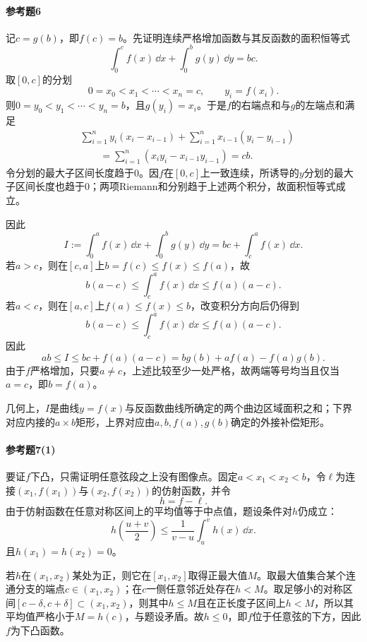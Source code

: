\paragraph{参考题6}
\begin{xsolution}
记$c=g(b)$，即$f(c)=b$。先证明连续严格增加函数与其反函数的面积恒等式
\[
 \int_0^cf(x)\,\dd x+\int_0^bg(y)\,\dd y=bc.
\]
取$[0,c]$的分划
\[
 0=x_0<x_1<\cdots<x_n=c,
 \qquad y_i=f(x_i).
\]
则$0=y_0<y_1<\cdots<y_n=b$，且$g(y_i)=x_i$。于是$f$的右端点和与$g$的左端点和满足
\begin{align*}
&\sum_{i=1}^ny_i(x_i-x_{i-1})
 +\sum_{i=1}^nx_{i-1}(y_i-y_{i-1})\\
&\qquad=\sum_{i=1}^n(x_iy_i-x_{i-1}y_{i-1})
 =cb.
\end{align*}
令分划的最大子区间长度趋于0。因$f$在$[0,c]$上一致连续，所诱导的$y$分划的最大子区间长度也趋于0；两项Riemann和分别趋于上述两个积分，故面积恒等式成立。

因此
\[
 I:=\int_0^af(x)\,\dd x+\int_0^bg(y)\,\dd y
 =bc+\int_c^af(x)\,\dd x.
\]
若$a>c$，则在$[c,a]$上$b=f(c)\le f(x)\le f(a)$，故
\[
 b(a-c)\le\int_c^af(x)\,\dd x\le f(a)(a-c).
\]
若$a<c$，则在$[a,c]$上$f(a)\le f(x)\le b$，改变积分方向后仍得到
\[
 b(a-c)\le\int_c^af(x)\,\dd x\le f(a)(a-c).
\]
因此
\[
 ab\le I\le bc+f(a)(a-c)
 =bg(b)+af(a)-f(a)g(b).
\]
由于$f$严格增加，只要$a\ne c$，上述比较至少一处严格，故两端等号均当且仅当$a=c$，即$b=f(a)$。

几何上，$I$是曲线$y=f(x)$与反函数曲线所确定的两个曲边区域面积之和；下界对应内接的$a\times b$矩形，上界对应由$a,b,f(a),g(b)$确定的外接补偿矩形。
\end{xsolution}

\paragraph{参考题7(1)}
\begin{xsolution}
要证$f$下凸，只需证明任意弦段之上没有图像点。固定$a<x_1<x_2<b$，令$\ell$为连接$(x_1,f(x_1))$与$(x_2,f(x_2))$的仿射函数，并令
\[
 h=f-\ell.
\]
由于仿射函数在任意对称区间上的平均值等于中点值，题设条件对$h$仍成立：
\[
 h\left(\frac{u+v}{2}\right)
 \le\frac1{v-u}\int_u^vh(x)\,\dd x.
\]
且$h(x_1)=h(x_2)=0$。

若$h$在$(x_1,x_2)$某处为正，则它在$[x_1,x_2]$取得正最大值$M$。取最大值集合某个连通分支的端点$c\in(x_1,x_2)$；在$c$一侧任意邻近处存在$h<M$。取足够小的对称区间$[c-\delta,c+\delta]\subset(x_1,x_2)$，则其中$h\le M$且在正长度子区间上$h<M$，所以其平均值严格小于$M=h(c)$，与题设矛盾。故$h\le0$，即$f$位于任意弦的下方，因此$f$为下凸函数。
\end{xsolution}

